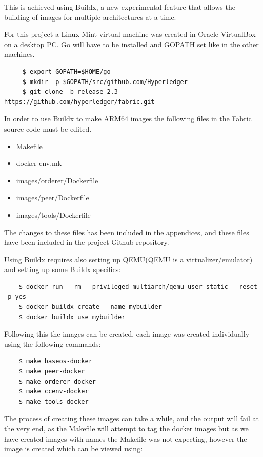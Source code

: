 This is achieved using Buildx, a new experimental feature that allows the building of images for multiple architectures at a time. 

For this project a Linux Mint virtual machine was created in Oracle VirtualBox on a desktop PC. Go will have to be installed and GOPATH set like in the other machines.

\begin{verbatim}
     $ export GOPATH=$HOME/go
     $ mkdir -p $GOPATH/src/github.com/Hyperledger
     $ git clone -b release-2.3 https://github.com/hyperledger/fabric.git
\end{verbatim} 


In order to use Buildx to make ARM64 images the following  files in the Fabric source code must be edited.
\begin{itemize}
    \item Makefile
    \item docker-env.mk
    \item images/orderer/Dockerfile
    \item images/peer/Dockerfile
    \item images/tools/Dockerfile
\end{itemize}

The changes to these files has been included in the appendices, and these files have been included in the project Github repository.

Using Buildx requires also setting up QEMU(QEMU is a virtualizer/emulator) and setting up some Buildx specifics:
\begin{verbatim}
    $ docker run --rm --privileged multiarch/qemu-user-static --reset -p yes
    $ docker buildx create --name mybuilder
    $ docker buildx use mybuilder
\end{verbatim}

Following this the images can be created, each image was created individually using the following commands:

\begin{verbatim}
    $ make baseos-docker
    $ make peer-docker
    $ make orderer-docker
    $ make ccenv-docker
    $ make tools-docker
\end{verbatim}

The process of creating these images can take a while, and the output will fail at the very end, as the Makefile will attempt to tag the docker images but as we have created images with names the Makefile was not expecting, however the image is created which can be viewed using:

